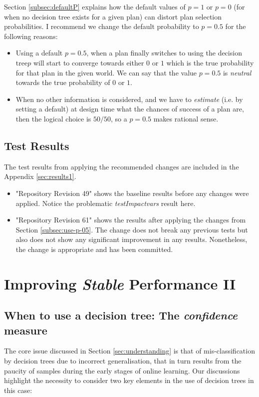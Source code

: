 \documentclass[a4paper]{article}
\newcommand{\tiv}{\emph{testImpactvars}\xspace}
\newcommand{\dt}{{decision tree}\xspace}
\begin{document}
Section \ref{subsec:defaultP} explains how the default values of $p=1$ or $p=0$ (for when no \dt exists for a given plan) can distort plan selection probabilities. I recommend we change the default probability to $p=0.5$ for the following reasons:
\begin{itemize}
\item Using a default $p=0.5$, when a plan finally switches to using the \dt $p$ will start to converge towards either $0$ or $1$ which is the true probability for that plan in the given world. We can say that the value $p=0.5$ is \emph{neutral} towards the true probability of $0$ or $1$.
\item When no other information is considered, and we have to \emph{estimate} (i.e. by setting a default) at design time what the chances of success of a plan are, then the logical choice is $50/50$, so a $p=0.5$ makes rational sense.
\end{itemize}

\subsection{Test Results}
The test results from applying the recommended changes are included in the Appendix \ref{sec:results1}.
\begin{itemize}
\item "Repository Revision 49" shows the baseline results before any changes were applied. Notice the problematic \tiv result here.
\item "Repository Revision 61" shows the results after applying the changes from Section \ref{subsec:use-p-05}. The change does not break any previous tests but also does not show any significant improvement in any results. Nonetheless, the change is appropriate and has been committed.
\end{itemize}


\section{Improving \textit{Stable} Performance II}
\label{sec:stable2}

\subsection{When to use a \dt: The \textit{confidence} measure}
\label{subsec:confidence}
The core issue discussed in Section \ref{sec:understanding} is that of mis-classification by {\dt}s due to incorrect generalisation, that in turn results from the paucity of samples during the early stages of online learning. Our discussions highlight the necessity to consider two key elements in the use of {\dt}s in this case:
\end{document}
